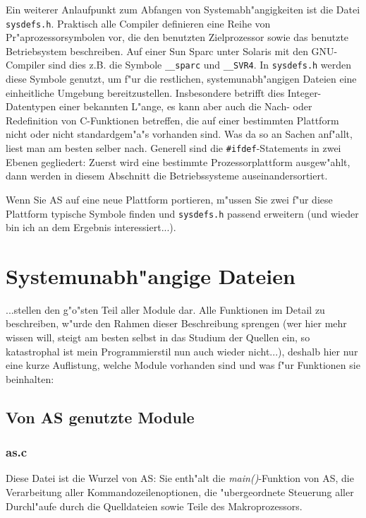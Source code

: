\documentclass[12pt,a4paper,twoside]{report}
\begin{document}
Ein weiterer Anlaufpunkt zum Abfangen von Systemabh"angigkeiten ist die
Datei {\tt sysdefs.h}.  Praktisch alle Compiler definieren eine Reihe von
Pr"aprozessorsymbolen vor, die den benutzten Zielprozessor sowie das
benutzte Betriebsystem beschreiben.  Auf einer Sun Sparc unter Solaris
mit den GNU-Compiler sind dies z.B. die Symbole \verb!__sparc! und
\verb!__SVR4!.  In {\tt sysdefs.h} werden diese Symbole genutzt, um f"ur
die restlichen, systemunabh"angigen Dateien eine einheitliche Umgebung
bereitzustellen.  Insbesondere betrifft dies Integer-Datentypen einer
bekannten L"ange, es kann aber auch die Nach- oder Redefinition von
C-Funktionen betreffen, die auf einer bestimmten Plattform nicht oder
nicht standardgem"a"s vorhanden sind.  Was da so an Sachen anf"allt, liest
man am besten selber nach.  Generell sind die \verb!#ifdef!-Statements in
zwei Ebenen gegliedert: Zuerst wird eine bestimmte Prozessorplattform
ausgew"ahlt, dann werden in diesem Abschnitt die Betriebssysteme
auseinandersortiert.

Wenn Sie AS auf eine neue Plattform portieren, m"ussen Sie zwei f"ur diese
Plattform typische Symbole finden und {\tt sysdefs.h} passend erweitern
(und wieder bin ich an dem Ergebnis interessiert...).


\section{Systemunabh"angige Dateien}

...stellen den g"o"sten Teil aller Module dar.  Alle Funktionen im Detail
zu beschreiben, w"urde den Rahmen dieser Beschreibung sprengen (wer hier
mehr wissen will, steigt am besten selbst in das Studium der Quellen ein,
so katastrophal ist mein Programmierstil nun auch wieder nicht...),
deshalb hier nur eine kurze Auflistung, welche Module vorhanden sind und
was f"ur Funktionen sie beinhalten:

\subsection{Von AS genutzte Module}

\subsubsection{as.c}

Diese Datei ist die Wurzel von AS: Sie enth"alt die {\em main()}-Funktion
von AS, die Verarbeitung aller Kommandozeilenoptionen, die "ubergeordnete
Steuerung aller Durchl"aufe durch die Quelldateien sowie Teile des
Makroprozessors.
\end{document}
